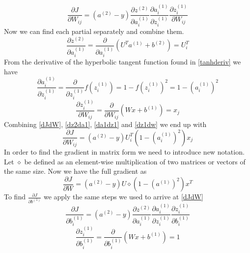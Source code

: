 \documentclass{article}
\begin{document}
\begin{equation}\label{dJdW}
\frac{\partial J}{\partial W_{ij}} = \left(a^{(2)} - y\right)\frac{\partial z^{(2)}}{\partial a_{i}^{(1)}}\frac{\partial a_{i}^{(1)}}{\partial z_{i}^{(1)}}\frac{\partial z_{i}^{(1)}}{\partial W_{ij}}
\end{equation}
Now we can find each partial separately and combine them.
\begin{equation}\label{dz2da1}
\frac{\partial z^{(2)}}{\partial a_{i}^{(1)}} = \frac{\partial}{\partial a_{i}^{(1)}}\left(U^Ta^{(1)}+b^{(2)}\right) = U^T_{i}
\end{equation}
From the derivative of the hyperbolic tangent function found in \eqref{tanhderiv} we have
\begin{equation}\label{da1dz1}
\frac{\partial a_{i}^{(1)}}{\partial z_{i}^{(1)}} = \frac{\partial}{\partial z_{i}^{(1)}}f(z_i^{(1)})  = 1-f(z_i^{(1)})^2 = 1-(a_i^{(1)})^2
\end{equation}
\begin{equation}\label{dz1dw}
\frac{\partial z_{i}^{(1)}}{\partial W_{ij}} = \frac{\partial}{\partial W_{ij}} \left( Wx+b^{(1)} \right) = x_j
\end{equation}
Combining \eqref{dJdW}, \eqref{dz2da1}, \eqref{da1dz1} and \eqref{dz1dw} we end up with
\begin{equation}
\frac{\partial J}{\partial W_{ij}} = \left(a^{(2)} - y\right) U^T_{i} \left( 1-(a_i^{(1)})^2 \right) x_j 
\end{equation}
In order to find the gradient in matrix form we need to introduce new notation.  Let \(\diamond \) be defined as an element-wise multiplication of two matrices or vectors of the same size.  Now we have the full gradient as
\begin{equation}\label{djdw}
\frac{\partial J}{\partial W} = \left(a^{(2)} - y\right) U \diamond\left( 1-(a^{(1)})^2 \right) x^T
\end{equation}
To find \(\frac{\partial J}{\partial b^{(1)}}\) we apply the same steps we used to arrive at \eqref{dJdW}
\begin{equation}
\frac{\partial J}{\partial b^{(1)}_{i}} = \left(a^{(2)} - y\right)\frac{\partial z^{(2)}}{\partial a_{i}^{(1)}}\frac{\partial a_{i}^{(1)}}{\partial z_{i}^{(1)}}\frac{\partial z_{i}^{(1)}}{\partial b_{i}^{(1)}}
\end{equation}
\begin{equation}\label{dz1db1}
\frac{\partial z_{i}^{(1)}}{\partial b_{i}^{(1)}} = \frac{\partial}{\partial b^{(1)}_{i}} \left( Wx+b^{(1)} \right) = 1
\end{equation}
\end{document}
